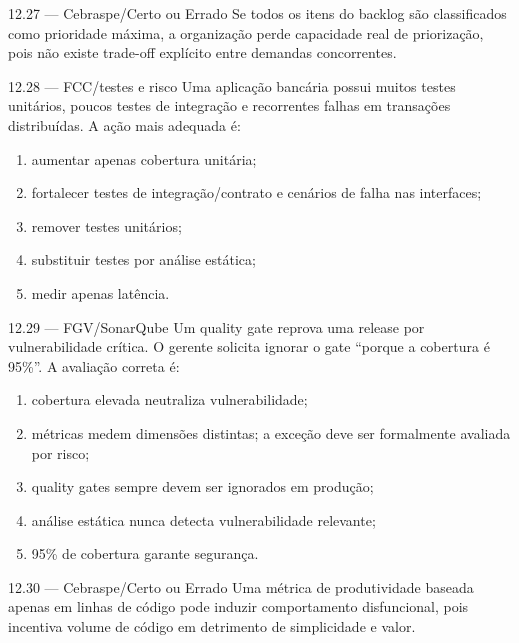 \begin{questao}{ 12.27 — Cebraspe/Certo ou Errado}
Se todos os itens do backlog são classificados como prioridade máxima, a organização perde capacidade real de priorização, pois não existe trade-off explícito entre demandas concorrentes.
\end{questao}

\begin{questao}{ 12.28 — FCC/testes e risco}
Uma aplicação bancária possui muitos testes unitários, poucos testes de integração e recorrentes falhas em transações distribuídas. A ação mais adequada é:
\begin{enumerate}[label=\Alph*)]
\item aumentar apenas cobertura unitária;
\item fortalecer testes de integração/contrato e cenários de falha nas interfaces;
\item remover testes unitários;
\item substituir testes por análise estática;
\item medir apenas latência.
\end{enumerate}
\end{questao}

\begin{questao}{ 12.29 — FGV/SonarQube}
Um quality gate reprova uma release por vulnerabilidade crítica. O gerente solicita ignorar o gate ``porque a cobertura é 95\%''. A avaliação correta é:
\begin{enumerate}[label=\Alph*)]
\item cobertura elevada neutraliza vulnerabilidade;
\item métricas medem dimensões distintas; a exceção deve ser formalmente avaliada por risco;
\item quality gates sempre devem ser ignorados em produção;
\item análise estática nunca detecta vulnerabilidade relevante;
\item 95\% de cobertura garante segurança.
\end{enumerate}
\end{questao}

\begin{questao}{ 12.30 — Cebraspe/Certo ou Errado}
Uma métrica de produtividade baseada apenas em linhas de código pode induzir comportamento disfuncional, pois incentiva volume de código em detrimento de simplicidade e valor.
\end{questao}


